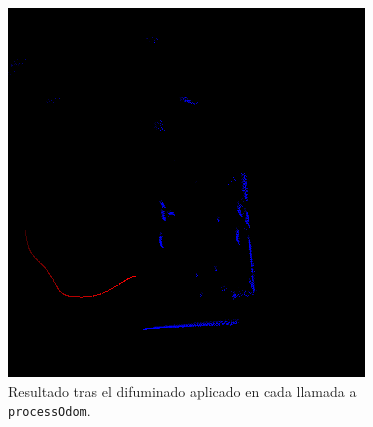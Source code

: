 \begin{figure}[!ht]
    \centering
    \includegraphics[scale=0.75]{images/difuminado.png}
    \caption{Resultado tras el difuminado aplicado en cada llamada a \texttt{processOdom}.}
    \label{fig:difuminado}
\end{figure}